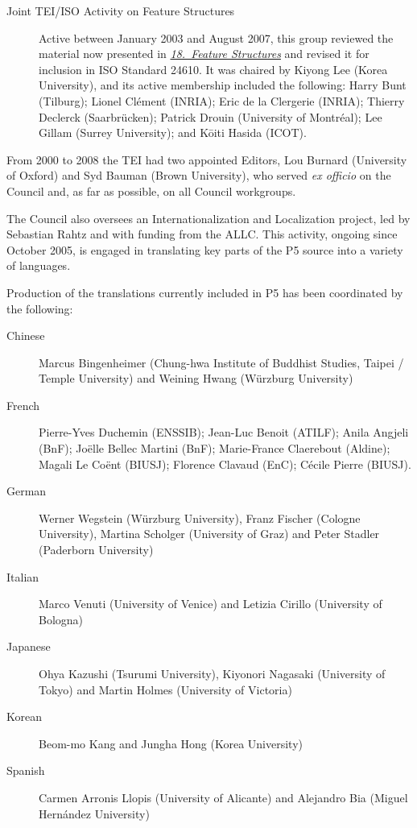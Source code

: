 \begin{description}
\item[{Joint TEI/ISO Activity on Feature Structures}]\par
Active between January 2003 and August 2007, this group reviewed the material now presented in \textit{\hyperref[FS]{18.\ Feature Structures}} and revised it for inclusion in ISO Standard 24610. It was chaired by Kiyong Lee (Korea University), and its active membership included the following: Harry Bunt (Tilburg); Lionel Clément (INRIA); Eric de la Clergerie (INRIA); Thierry Declerck (Saarbrücken); Patrick Drouin (University of Montréal); Lee Gillam (Surrey University); and Kōiti Hasida (ICOT).
\end{description} \par
From 2000 to 2008 the TEI had two appointed Editors, Lou Burnard (University of Oxford) and Syd Bauman (Brown University), who served \textit{ex officio} on the Council and, as far as possible, on all Council workgroups.\par
The Council also oversees an Internationalization and Localization project, led by Sebastian Rahtz and with funding from the ALLC. This activity, ongoing since October 2005, is engaged in translating key parts of the P5 source into a variety of languages.\par
Production of the translations currently included in P5 has been coordinated by the following: \begin{description}

\item[{Chinese}]Marcus Bingenheimer (Chung-hwa Institute of Buddhist Studies, Taipei / Temple University) and Weining Hwang (Würzburg University)
\item[{French}]Pierre-Yves Duchemin (ENSSIB); Jean-Luc Benoit (ATILF); Anila Angjeli (BnF); Joëlle Bellec Martini (BnF); Marie-France Claerebout (Aldine); Magali Le Coënt (BIUSJ); Florence Clavaud (EnC); Cécile Pierre (BIUSJ). 
\item[{German}]Werner Wegstein (Würzburg University), Franz Fischer (Cologne University), Martina Scholger (University of Graz) and Peter Stadler (Paderborn University) 
\item[{Italian}]Marco Venuti (University of Venice) and Letizia Cirillo (University of Bologna) 
\item[{Japanese}]Ohya Kazushi (Tsurumi University), Kiyonori Nagasaki (University of Tokyo) and Martin Holmes (University of Victoria)
\item[{Korean}]Beom-mo Kang and Jungha Hong (Korea University)
\item[{Spanish}]Carmen Arronis Llopis (University of Alicante) and Alejandro Bia (Miguel Hernández University)
\end{description} \par

